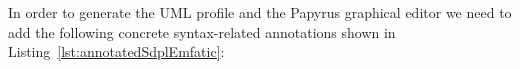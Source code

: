\begin{figure}[t]
	
	\vspace*{-5mm}
\end{figure}

In order to generate the UML profile and the Papyrus graphical editor we need to add the following concrete syntax-related annotations shown in Listing~\ref{lst:annotatedSdplEmfatic}:

